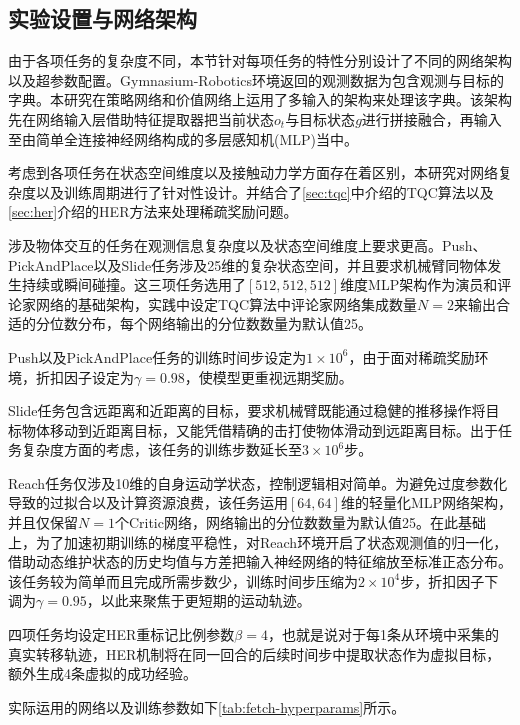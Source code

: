 \subsection{实验设置与网络架构}\label{sec:experiment-setup}
由于各项任务的复杂度不同，本节针对每项任务的特性分别设计了不同的网络架构以及超参数配置。Gymnasium-Robotics环境返回的观测数据为包含观测与目标的字典。本研究在策略网络和价值网络上运用了多输入的架构来处理该字典。该架构先在网络输入层借助特征提取器把当前状态$o_t$与目标状态$g$进行拼接融合，再输入至由简单全连接神经网络构成的多层感知机(MLP)当中。

考虑到各项任务在状态空间维度以及接触动力学方面存在着区别，本研究对网络复杂度以及训练周期进行了针对性设计。并结合了\cref{sec:tqc}中介绍的TQC算法以及\cref{sec:her}介绍的HER方法来处理稀疏奖励问题。

涉及物体交互的任务在观测信息复杂度以及状态空间维度上要求更高。Push、PickAndPlace以及Slide任务涉及25维的复杂状态空间，并且要求机械臂同物体发生持续或瞬间碰撞。这三项任务选用了$[512, 512, 512]$维度MLP架构作为演员和评论家网络的基础架构，实践中设定TQC算法中评论家网络集成数量$N=2$来输出合适的分位数分布，每个网络输出的分位数数量为默认值25。

Push以及PickAndPlace任务的训练时间步设定为$1 \times 10^6$，由于面对稀疏奖励环境，折扣因子设定为$\gamma = 0.98$，使模型更重视远期奖励。

Slide任务包含远距离和近距离的目标，要求机械臂既能通过稳健的推移操作将目标物体移动到近距离目标，又能凭借精确的击打使物体滑动到远距离目标。出于任务复杂度方面的考虑，该任务的训练步数延长至$3 \times 10^6$步。

Reach任务仅涉及10维的自身运动学状态，控制逻辑相对简单。为避免过度参数化导致的过拟合以及计算资源浪费，该任务运用$[64, 64]$维的轻量化MLP网络架构，并且仅保留$N=1$个Critic网络，网络输出的分位数数量为默认值25。在此基础上，为了加速初期训练的梯度平稳性，对Reach环境开启了状态观测值的归一化，借助动态维护状态的历史均值与方差把输入神经网络的特征缩放至标准正态分布。该任务较为简单而且完成所需步数少，训练时间步压缩为$2 \times 10^4$步，折扣因子下调为$\gamma = 0.95$，以此来聚焦于更短期的运动轨迹。

四项任务均设定HER重标记比例参数$\beta = 4$，也就是说对于每1条从环境中采集的真实转移轨迹，HER机制将在同一回合的后续时间步中提取状态作为虚拟目标，额外生成4条虚拟的成功经验。

实际运用的网络以及训练参数如下\cref{tab:fetch-hyperparams}所示。

